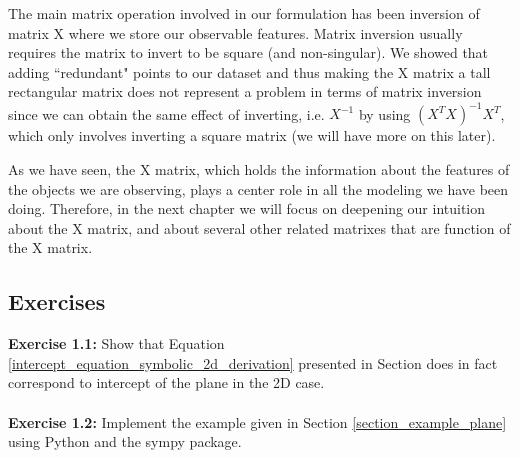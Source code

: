 The main matrix operation involved in our formulation has been inversion of matrix X where we store our observable features. Matrix inversion usually requires the matrix to invert to be square (and non-singular). We showed that adding ``redundant" points to our dataset and thus making the X matrix a tall rectangular matrix does not represent a problem in terms of matrix inversion since we can obtain the same effect of inverting, i.e. $X^{-1}$ by using $(X^T X)^{-1} X^T$, which only involves inverting a square matrix (we will have more on this later). 

As we have seen, the X matrix, which holds the information about the features of the objects we are observing, plays a center role in all the modeling we have been doing. Therefore, in the next chapter we will focus on deepening our intuition about the X matrix, and about several other related matrixes that are function of the X matrix.

\subsection{Exercises}

\textbf{Exercise 1.1:} Show that Equation \ref{intercept_equation_symbolic_2d_derivation} presented in Section does in fact correspond to intercept of the plane in the 2D case.
\\
\\
\textbf{Exercise 1.2:} Implement the example given in Section \ref{section_example_plane} using Python and the sympy package.




\pagebreak


